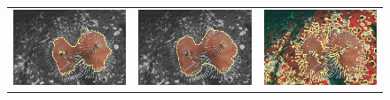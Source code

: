 \documentclass[runningheads]{llncs}
\begin{document}
\begin{figure}
\begin{tabular}{ccc}
		\includegraphics[scale=0.2]{images/segmentation/bc/coral/gc-seg.png} &
		\includegraphics[scale=0.2]{images/segmentation/bc/coral/corrected-seg.png} &					\includegraphics[scale=0.2]{images/segmentation/schoenemann/coral/coral-seg.png}\\				
						
	\end{tabular}
	\caption{}
	\label{fig:more-segmentation-results}	
\end{figure}
\end{document}
